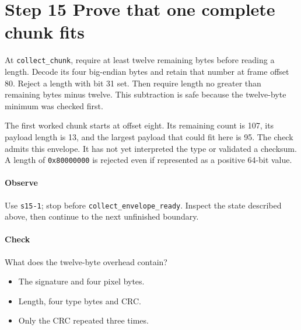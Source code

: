 \section{Step 15 Prove that one complete chunk fits}\label{png-collect-s15}
At \texttt{collect\_chunk}, require at least twelve remaining bytes before reading a length. Decode its four big-endian bytes and retain that number at frame offset 80. Reject a length with bit 31 set. Then require length no greater than remaining bytes minus twelve. This subtraction is safe because the twelve-byte minimum was checked first.

The first worked chunk starts at offset eight. Its remaining count is 107, its payload length is 13, and the largest payload that could fit here is 95. The check admits this envelope. It has not yet interpreted the type or validated a checksum. A length of \texttt{0x80000000} is rejected even if represented as a positive 64-bit value.

\paragraph{Observe} Use \texttt{s15-1}; stop before \texttt{collect\_envelope\_ready}. Inspect the state described above, then continue to the next unfinished boundary.

\paragraph{Check} What does the twelve-byte overhead contain?
\begin{itemize}
  \item[A.] The signature and four pixel bytes.
  \item[B.] Length, four type bytes and CRC.
  \item[C.] Only the CRC repeated three times.
\end{itemize}
